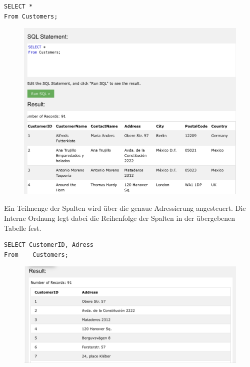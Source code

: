 \begin{lstlisting}[style=SQL]
SELECT *
From Customers;
\end{lstlisting}

\begin{figure}[H]
	\centering
	\includegraphics[scale = 0.3]{attachment/chapter_3/Scc048}
	\caption{}
	\label{fig:Scc048}
\end{figure}

Ein Teilmenge der Spalten wird über die genaue Adressierung angesteuert.
Die Interne Ordnung legt dabei die Reihenfolge der Spalten in der übergebenen Tabelle fest.

\begin{lstlisting}[style=SQL]
SELECT CustomerID, Adress
From	Customers;
\end{lstlisting}

\begin{figure}[H]
	\centering
	\includegraphics[scale = 0.3]{attachment/chapter_3/Scc049}
	\caption{}
	\label{fig:Scc049}
\end{figure}

